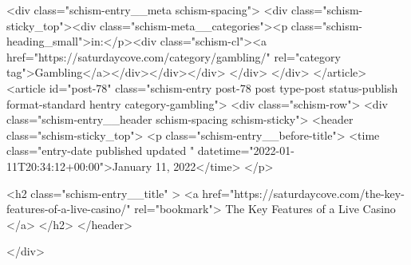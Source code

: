 {		<div class="schism-entry__meta schism-spacing">			<div class="schism-sticky_top"><div class="schism-meta__categories"><p class="schism-heading_small">in:</p><div class="schism-cl"><a href="https://saturdaycove.com/category/gambling/" rel="category tag">Gambling</a></div></div></div>		</div>
	</div>
</article>
<article id="post-78" class="schism-entry post-78 post type-post status-publish format-standard hentry category-gambling">
	<div class="schism-row">		<div class="schism-entry__header schism-spacing schism-sticky">			<header class="schism-sticky_top">				<p class="schism-entry__before-title">
					<time class="entry-date published updated " datetime="2022-01-11T20:34:12+00:00">January 11, 2022</time>				</p>

				<h2 class="schism-entry__title" >
					<a href="https://saturdaycove.com/the-key-features-of-a-live-casino/" rel="bookmark">
						The Key Features of a Live Casino					</a>
				</h2>
			</header>

					</div>

}
